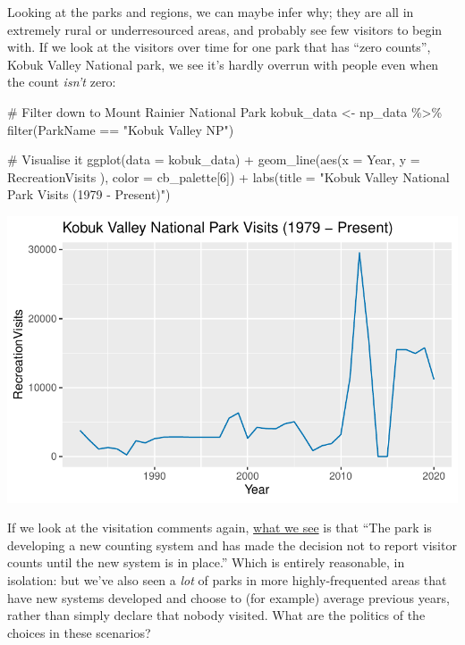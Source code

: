 \documentclass[
  letterpaper,
  DIV=11,
  numbers=noendperiod]{scrartcl}
\newenvironment{Shaded}{\begin{snugshade}}{\end{snugshade}}
\newcommand{\AttributeTok}[1]{\textcolor[rgb]{0.40,0.45,0.13}{#1}}
\newcommand{\CommentTok}[1]{\textcolor[rgb]{0.37,0.37,0.37}{#1}}
\newcommand{\DecValTok}[1]{\textcolor[rgb]{0.68,0.00,0.00}{#1}}
\newcommand{\FunctionTok}[1]{\textcolor[rgb]{0.28,0.35,0.67}{#1}}
\newcommand{\NormalTok}[1]{\textcolor[rgb]{0.00,0.23,0.31}{#1}}
\newcommand{\OtherTok}[1]{\textcolor[rgb]{0.00,0.23,0.31}{#1}}
\newcommand{\SpecialCharTok}[1]{\textcolor[rgb]{0.37,0.37,0.37}{#1}}
\newcommand{\StringTok}[1]{\textcolor[rgb]{0.13,0.47,0.30}{#1}}
\begin{document}
Looking at the parks and regions, we can maybe infer why; they are all
in extremely rural or underresourced areas, and probably see few
visitors to begin with. If we look at the visitors over time for one
park that has ``zero counts'', Kobuk Valley National park, we see it's
hardly overrun with people even when the count \emph{isn't} zero:

\begin{Shaded}
\begin{Highlighting}[]
\CommentTok{\# Filter down to Mount Rainier National Park}
\NormalTok{kobuk\_data }\OtherTok{\textless{}{-}}\NormalTok{ np\_data }\SpecialCharTok{\%\textgreater{}\%} \FunctionTok{filter}\NormalTok{(ParkName }\SpecialCharTok{==} \StringTok{"Kobuk Valley NP"}\NormalTok{)}

\CommentTok{\# Visualise it}
\FunctionTok{ggplot}\NormalTok{(}\AttributeTok{data =}\NormalTok{ kobuk\_data) }\SpecialCharTok{+} 
  \FunctionTok{geom\_line}\NormalTok{(}\FunctionTok{aes}\NormalTok{(}\AttributeTok{x =}\NormalTok{ Year, }\AttributeTok{y =}\NormalTok{ RecreationVisits ), }\AttributeTok{color =}\NormalTok{ cb\_palette[}\DecValTok{6}\NormalTok{]) }\SpecialCharTok{+}
  \FunctionTok{labs}\NormalTok{(}\AttributeTok{title =} \StringTok{"Kobuk Valley National Park Visits (1979 {-} Present)"}\NormalTok{)}
\end{Highlighting}
\end{Shaded}

\includegraphics{index_files/figure-pdf/unnamed-chunk-8-1.pdf}

If we look at the visitation comments again,
\href{https://irma.nps.gov/Stats/SSRSReports/Park\%20Specific\%20Reports/Monthly\%20Visitation\%20Comments\%20By\%20Park}{what
we see} is that ``The park is developing a new counting system and has
made the decision not to report visitor counts until the new system is
in place.'' Which is entirely reasonable, in isolation: but we've also
seen a \emph{lot} of parks in more highly-frequented areas that have new
systems developed and choose to (for example) average previous years,
rather than simply declare that nobody visited. What are the politics of
the choices in these scenarios?
\end{document}
